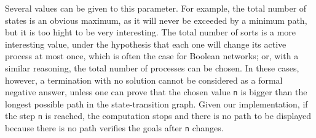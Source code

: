 Several values can be given to this parameter.
For example, the total number of states is an obvious maximum,
as it will never be exceeded by a minimum path,
but it is too hight to be very interesting.
The total number of sorts is a more interesting value,
under the hypothesis that each one will change its active process at most once,
which is often the case for Boolean networks;
or, with a similar reasoning, the total number of processes can be chosen.
In these cases, however, a termination with no solution cannot be considered as a formal
negative answer, unless one can prove that the chosen value \texttt{n}
is bigger than the longest possible path in the state-transition graph.
Given our implementation, if the step \texttt{n} is reached,
the computation stops and there is no path to be displayed because there is no path verifies the goals after \texttt{n} changes.
